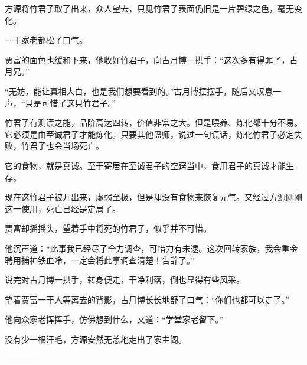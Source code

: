 \begin{this_body}
方源将竹君子取了出来，众人望去，只见竹君子表面仍旧是一片碧绿之色，毫无变化。

一干家老都松了口气。

贾富的面色也缓和下来，他收好竹君子，向古月博一拱手：“这次多有得罪了，古月兄。”

“无妨，能让真相大白，也是我们想要看到的。”古月博摆摆手，随后又叹息一声，“只是可惜了这只竹君子。”

竹君子有测谎之能，品阶高达四转，价值非常之大。但是喂养、炼化都十分不易。它必须是由至诚君子才能炼化。只要其他蛊师，说过一句谎话，炼化竹君子必定失败，竹君子也会当场死亡。

它的食物，就是真诚。至于寄居在至诚君子的空窍当中，食用君子的真诚才能生存。

现在这竹君子被开出来，虚弱至极，但是却没有食物来恢复元气。又经过方源刚刚这一使用，死亡已经是定局了。

贾富却摇摇头，望着手中将死的竹君子，似乎并不可惜。

他沉声道：“此事我已经尽了全力调查，可惜力有未逮。这次回转家族，我会重金聘用捕神铁血冷，一定会将此事调查清楚！告辞了。”

说完对古月博一拱手，转身便走，干净利落，倒也显得有些风采。

望着贾富一干人等离去的背影，古月博长长地舒了口气：“你们也都可以走了。”

他向众家老挥挥手，仿佛想到什么，又道：“学堂家老留下。”

没有少一根汗毛，方源安然无恙地走出了家主阁。

------------

\end{this_body}

